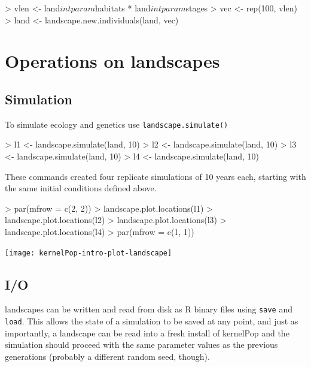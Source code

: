\documentclass[10pt]{article}
\newcommand{\code}[1]{\texttt{#1}}
\begin{document}
\begin{Schunk}
\begin{Sinput}
> vlen <- land$intparam$habitats * land$intparam$stages
> vec <- rep(100, vlen)
> land <- landscape.new.individuals(land, vec)
\end{Sinput}
\end{Schunk}

\section{Operations on landscapes}
\label{sec:oper-landsc}

\subsection{Simulation}
\label{sec:simulation}
To simulate ecology and genetics use \code{landscape.simulate()} 

\begin{Schunk}
\begin{Sinput}
> l1 <- landscape.simulate(land, 10)
> l2 <- landscape.simulate(land, 10)
> l3 <- landscape.simulate(land, 10)
> l4 <- landscape.simulate(land, 10)
\end{Sinput}
\end{Schunk}

These commands created four replicate simulations of 10 years each,
starting with the same initial conditions defined above.

\begin{Schunk}
\begin{Sinput}
> par(mfrow = c(2, 2))
> landscape.plot.locations(l1)
> landscape.plot.locations(l2)
> landscape.plot.locations(l3)
> landscape.plot.locations(l4)
> par(mfrow = c(1, 1))
\end{Sinput}
\end{Schunk}
\texttt{[image: kernelPop-intro-plot-landscape]}

\subsection{I/O}
\label{sec:io}

landscapes can be written and read from disk as R binary files using
\code{save} and \code{load}.  This allows the state of a simulation to
be saved at any point, and just as importantly, a landscape can be
read into a fresh install of kernelPop and the simulation should proceed
with the same parameter values as the previous generations (probably a
different random seed, though).
\end{document}
